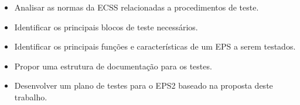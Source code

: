\begin{itemize}
    \item Analisar as normas da ECSS relacionadas a procedimentos de teste.
    \item Identificar os principais blocos de teste necessários.
    \item Identificar os principais funções e características de um \gls{EPS} a serem testados.
    \item Propor uma estrutura de documentação para os testes.
    \item Desenvolver um plano de testes para o \gls{EPS2} baseado na proposta deste trabalho.
\end{itemize}